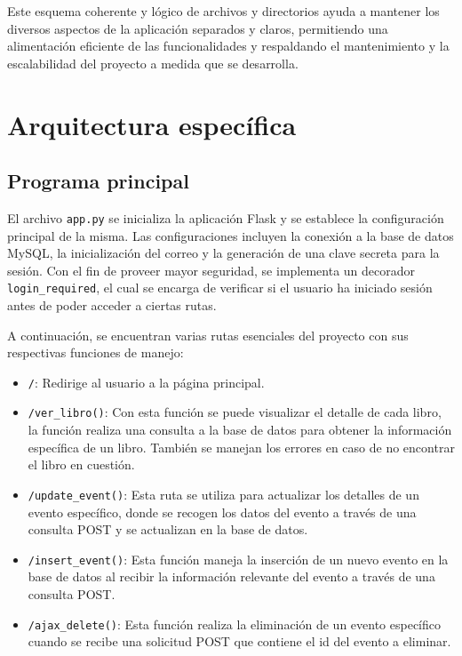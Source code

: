 \documentclass[a4paper, 12pt]{book}
\begin{document}
Este esquema coherente y lógico de archivos y directorios ayuda a mantener los diversos aspectos de la aplicación separados y claros, permitiendo una alimentación 
eficiente de las funcionalidades y respaldando el mantenimiento y la escalabilidad del proyecto a medida que se desarrolla.

\section{Arquitectura específica} 
\label{sec:arquitectura}

\subsection{Programa principal}
\label{subsec:programaprincipal}

El archivo \texttt{app.py} se inicializa la aplicación Flask y se establece la configuración principal de la misma. Las configuraciones incluyen la conexión a la base de datos 
MySQL, la inicialización del correo y la generación de una clave secreta para la sesión.
Con el fin de proveer mayor seguridad, se implementa un decorador \texttt{login\_required}, el cual se encarga de verificar si el usuario ha iniciado sesión antes de 
poder acceder a ciertas rutas.

A continuación, se encuentran varias rutas esenciales del proyecto con sus respectivas funciones de manejo:

\begin{itemize}
   \item \texttt{/}: Redirige al usuario a la página principal.
   \item \texttt{/ver\_libro()}: Con esta función se puede visualizar el detalle de cada libro, la función realiza una consulta a la base de datos para obtener la 
   información específica de un libro. También se manejan los errores en caso de no encontrar el libro en cuestión.
   \item \texttt{/update\_event()}: Esta ruta se utiliza para actualizar los detalles de un evento específico, donde se recogen los datos del evento a través de una 
   consulta POST y se actualizan en la base de datos.
   \item \texttt{/insert\_event()}: Esta función maneja la inserción de un nuevo evento en la base de datos al recibir la información relevante del evento a través de una consulta POST.
   \item \texttt{/ajax\_delete()}: Esta función realiza la eliminación de un evento específico cuando se recibe una solicitud POST que contiene el id del evento a eliminar.
\end{itemize}
\end{document}
